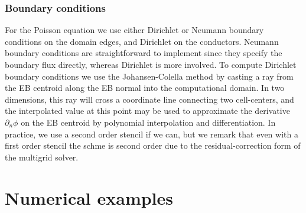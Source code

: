 \documentclass[3p]{elsarticle}
\begin{document}
\subsubsection{Boundary conditions}
For the Poisson equation we use either Dirichlet or Neumann boundary conditions on the domain edges, and Dirichlet on the conductors. Neumann boundary conditions are straightforward to implement since they specify the boundary flux directly, whereas Dirichlet is more involved. To compute Dirichlet boundary conditions we use the Johansen-Colella method by casting a ray from the EB centroid along the EB normal into the computational domain. In two dimensions, this ray will cross a coordinate line connecting two cell-centers, and the interpolated value at this point may be used to approximate the derivative $\partial_n\phi$ on the EB centroid by polynomial interpolation and differentiation. In practice, we use a second order stencil if we can, but we remark that even with a first order stencil the schme is second order due to the residual-correction form of the multigrid solver. 





 
\section{Numerical examples}
\label{sec:examples}
\end{document}
